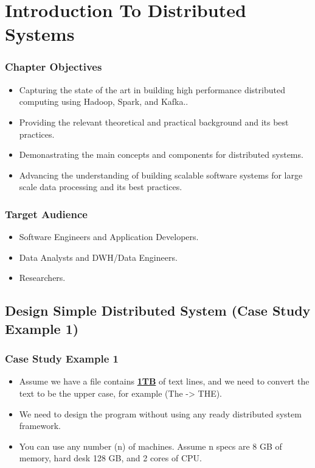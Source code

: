 \section{Introduction To Distributed Systems}


\begin{frame}
\frametitle{Chapter Objectives}

\begin{itemize} [<+->]
	\item Capturing the state of the art in building high performance distributed computing using Hadoop, Spark, and Kafka.. 
	\item Providing the relevant theoretical and practical background and its best practices.
	\item Demonastrating the main concepts and components for distributed systems. 
	\item Advancing the understanding of building scalable software systems for large scale data processing and its best practices. 
\end{itemize}

\end{frame}


\begin{frame}
	\frametitle{Target Audience}
	
	\begin{itemize} [<+->]
		\item Software Engineers and Application Developers.
		\item Data Analysts and DWH/Data Engineers.
		\item Researchers.
	\end{itemize}
	
\end{frame}

\subsection{Design Simple Distributed System (Case Study Example 1)}
\begin{frame}
	\frametitle{Case Study Example 1}
	\begin{itemize}  [<+->]
		\item Assume we have a file contains \textbf{\underline{1TB}} of text lines, and we need to convert the text to be the upper case, for example (The -> THE).
		\item We need to design the program without using any ready distributed system framework.
		\item You can use any number (n) of machines. Assume n specs are 8 GB of memory, hard desk 128 GB, and 2 cores of CPU.

	\end{itemize}
\end{frame}


